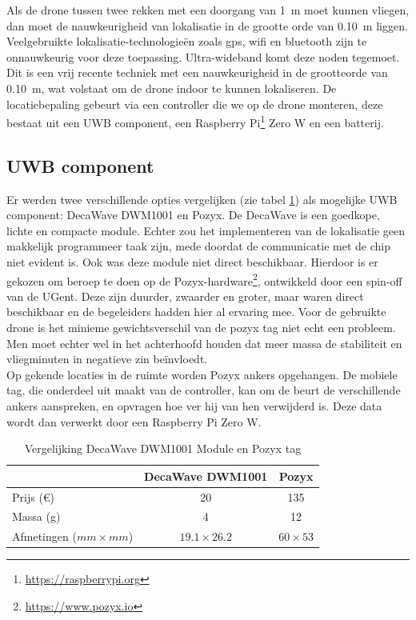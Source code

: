 Als de drone tussen twee rekken met een doorgang van \SI{1}{\m} moet kunnen vliegen, dan moet de nauwkeurigheid van lokalisatie in de grootte orde van \SI{0.10}{\m} liggen. Veelgebruikte lokalisatie-technologie\"en zoals gps, wifi en bluetooth zijn te onnauwkeurig voor deze toepassing. Ultra-wideband komt deze noden tegemoet. Dit is een vrij recente techniek met een nauwkeurigheid in de grootteorde van \SI{0.10}{\m}, wat volstaat om de drone indoor te kunnen lokaliseren. De locatiebepaling gebeurt via een controller die we op de drone monteren, deze bestaat uit een UWB component, een Raspberry Pi\footnote{\url{https://raspberrypi.org}} Zero W en een batterij.\\

\subsection{UWB component} \label{sec:uwb}
Er werden twee verschillende opties vergelijken (zie tabel \ref{tab:decavspozyx}) als mogelijke UWB component: DecaWave DWM1001 en Pozyx. De DecaWave is een goedkope, lichte en compacte module. Echter zou het implementeren van de lokalisatie geen makkelijk programmeer taak zijn, mede doordat de communicatie met de chip niet evident is. Ook was deze module niet direct beschikbaar. Hierdoor is er gekozen om beroep te doen op de Pozyx-hardware\footnote{\url{https://www.pozyx.io}}, ontwikkeld door een spin-off van de UGent. Deze zijn duurder, zwaarder en groter, maar waren direct beschikbaar en de begeleiders hadden hier al ervaring mee. Voor de gebruikte drone is het minieme gewichtsverschil van de pozyx tag niet echt een probleem. Men moet echter wel in het achterhoofd houden dat meer massa de stabiliteit en vliegminuten in negatieve zin be\"invloedt.\\

Op gekende locaties in de ruimte worden Pozyx ankers opgehangen. De mobiele tag, die onderdeel uit maakt van de controller, kan om de beurt de verschillende ankers aanspreken, en opvragen hoe ver hij van hen verwijderd is. Deze data wordt dan verwerkt door een Raspberry Pi Zero W.\\

\begin{table}[p]
	\centering
	\begin{tabular}{ | l | c | c | } \hline
		& DecaWave DWM1001 & Pozyx \\
		\hline 
		\hline
		Prijs (\euro{}) & 20 & 135 \\ 
		\hline
		Massa (g) & 4 & 12 \\ 
		\hline
		Afmetingen ($mm \times mm$) & $19.1 \times 26.2$ & $60 \times 53$ \\ 
		\hline
	\end{tabular}
	\caption[Vergelijking DecaWave DWM1001 Module en Pozyx tag]{Vergelijking DecaWave DWM1001 Module en Pozyx tag}
	\label{tab:decavspozyx}
\end{table}


